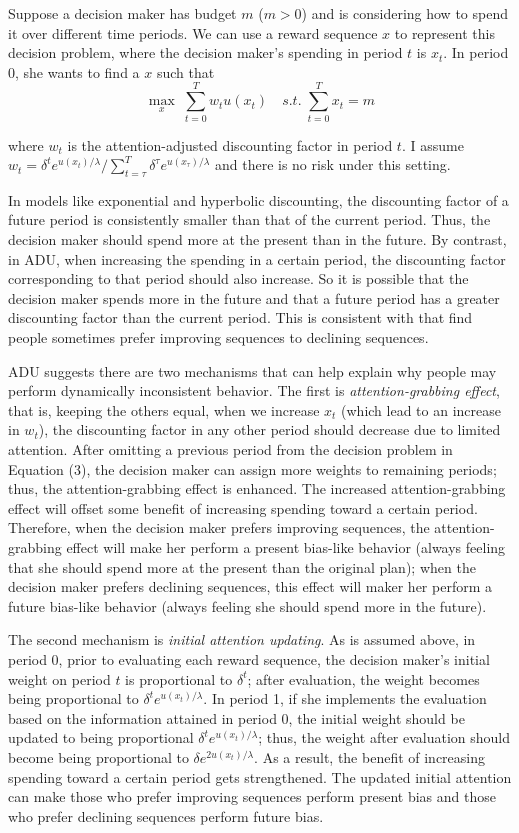 \documentclass[
  12pt,
]{article}
\begin{document}
Suppose a decision maker has budget \(m\) (\(m>0\)) and is considering
how to spend it over different time periods. We can use a reward
sequence \(x\) to represent this decision problem, where the decision
maker's spending in period \(t\) is \(x_t\). In period 0, she wants to
find a \(x\) such that\[ \tag{3}
\max_{x}\;\sum_{t=0}^T w_t u(x_t)\quad s.t. \;\sum_{t=0}^T x_t = m  
\]

where \(w_t\) is the attention-adjusted discounting factor in period
\(t\). I assume
\(w_t=\delta^t e^{u(x_t)/\lambda}/\sum_{t=\tau}^T \delta^{\tau} e^{u(x_\tau)/\lambda}\)
and there is no risk under this setting.

In models like exponential and hyperbolic discounting, the discounting
factor of a future period is consistently smaller than that of the
current period. Thus, the decision maker should spend more at the
present than in the future. By contrast, in ADU, when increasing the
spending in a certain period, the discounting factor corresponding to
that period should also increase. So it is possible that the decision
maker spends more in the future and that a future period has a greater
discounting factor than the current period. This is consistent with
\citet{loewenstein_preferences_1993} that find people sometimes prefer
improving sequences to declining sequences.

ADU suggests there are two mechanisms that can help explain why people
may perform dynamically inconsistent behavior. The first is
\emph{attention-grabbing effect}, that is, keeping the others equal,
when we increase \(x_t\) (which lead to an increase in \(w_t\)), the
discounting factor in any other period should decrease due to limited
attention. After omitting a previous period from the decision problem in
Equation (3), the decision maker can assign more weights to remaining
periods; thus, the attention-grabbing effect is enhanced. The increased
attention-grabbing effect will offset some benefit of increasing
spending toward a certain period. Therefore, when the decision maker
prefers improving sequences, the attention-grabbing effect will make her
perform a present bias-like behavior (always feeling that she should
spend more at the present than the original plan); when the decision
maker prefers declining sequences, this effect will maker her perform a
future bias-like behavior (always feeling she should spend more in the
future).

The second mechanism is \emph{initial attention updating}. As is assumed
above, in period 0, prior to evaluating each reward sequence, the
decision maker's initial weight on period \(t\) is proportional to
\(\delta^t\); after evaluation, the weight becomes being proportional to
\(\delta^t e^{u(x_t)/\lambda}\). In period 1, if she implements the
evaluation based on the information attained in period 0, the initial
weight should be updated to being proportional
\(\delta^t e^{u(x_t)/\lambda}\); thus, the weight after evaluation
should become being proportional to \(\delta e^{2u(x_t)/\lambda}\). As a
result, the benefit of increasing spending toward a certain period gets
strengthened. The updated initial attention can make those who prefer
improving sequences perform present bias and those who prefer declining
sequences perform future bias.
\end{document}
